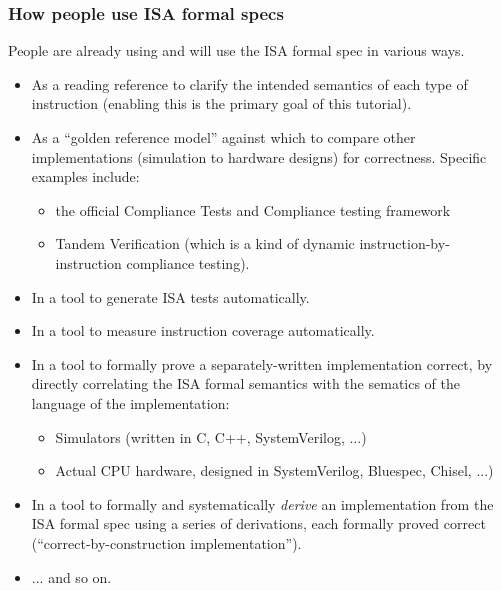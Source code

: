 \documentclass[aspectratio=169]{beamer}
\newcommand{\slidefont}{\scriptsize}
\begin{document}

\begin{frame}[fragile]
  \frametitle{How people use ISA formal specs}

  \slidefont

  People are already using and will use the ISA formal spec in various ways.

  \begin{itemize}

    \item As a reading reference to clarify the intended semantics of
      each type of instruction (enabling this is the primary goal of
      this tutorial).

    \item As a ``golden reference model'' against which to compare
      other implementations (simulation to hardware designs) for
      correctness.  Specific examples include:

      \begin{itemize}\slidefont
      \item the official Compliance Tests and Compliance testing framework
      \item Tandem Verification (which is a kind of dynamic instruction-by-instruction compliance testing).
      \end{itemize}

    \item In a tool to generate ISA tests automatically.

    \item In a tool to measure instruction coverage automatically.

    \item In a tool to formally prove a separately-written
      implementation correct, by directly correlating the ISA formal
      semantics with the sematics of the language of the
      implementation:
      
      \begin{itemize}\slidefont
      \item Simulators (written in C, C++, SystemVerilog, ...)
      \item Actual CPU hardware, designed in SystemVerilog, Bluespec, Chisel, ...)
      \end{itemize}


    \item In a tool to formally and systematically \emph{derive} an
      implementation from the ISA formal spec using a series of
      derivations, each formally proved correct
      (``correct-by-construction implementation'').

    \item ... and so on.
  \end{itemize}

\end{frame}
\end{document}

